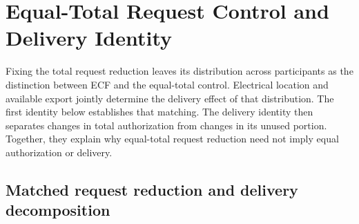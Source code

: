 \documentclass[11pt]{article}
\begin{document}
\section{Equal-Total Request Control and Delivery Identity}
\label{supp:comparative_controls}

Fixing the total request reduction leaves its distribution across participants
as the distinction between ECF and the equal-total control. Electrical location
and available export jointly determine the delivery effect of that distribution.
The first identity below
establishes that matching. The delivery identity then separates changes in total
authorization from changes in its unused portion. Together, they explain why
equal-total request reduction need not imply equal authorization or delivery.

\subsection{Matched request reduction and delivery decomposition}
\label{supp:full_equal_reduction_proof}
\end{document}
